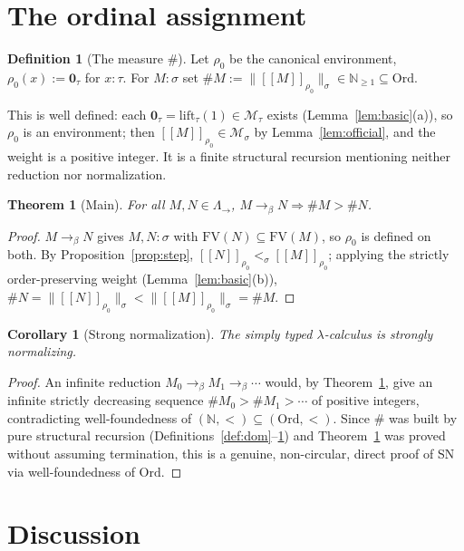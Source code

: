 \documentclass{amsart}
\newtheorem{theorem}{Theorem}
\newtheorem{corollary}{Corollary}
\theoremstyle{definition}
\newtheorem{definition}{Definition}
\newcommand{\Ord}{\mathrm{Ord}}
\newcommand{\interp}[1]{[\![#1]\!]}
\newcommand{\To}{\to_\beta}
\newcommand{\FV}{\mathrm{FV}}
\begin{document}
\section{The ordinal assignment}

\begin{definition}[The measure $\#$]\label{def:hash}
Let $\rho_0$ be the canonical environment, $\rho_0(x):=\mathbf 0_\tau$ for $x:\tau$. For
$M:\sigma$ set $\#M:=\|\interp{M}_{\rho_0}\|_\sigma\in\mathbb N_{\ge1}\subseteq\Ord$.
\end{definition}

This is well defined: each $\mathbf 0_\tau=\mathrm{lift}_\tau(1)\in\mathcal M_\tau$ exists
(Lemma~\ref{lem:basic}(a)), so $\rho_0$ is an environment; then
$\interp{M}_{\rho_0}\in\mathcal M_\sigma$ by Lemma~\ref{lem:official}, and the weight is a
positive integer. It is a finite structural recursion mentioning neither reduction nor
normalization.

\begin{theorem}[Main]\label{thm:main}
For all $M,N\in\Lambda_\to$, $M\To N\Rightarrow\#M>\#N$.
\end{theorem}

\begin{proof}
$M\To N$ gives $M,N:\sigma$ with $\FV(N)\subseteq\FV(M)$, so $\rho_0$ is defined on both.
By Proposition~\ref{prop:step}, $\interp{N}_{\rho_0}<_\sigma\interp{M}_{\rho_0}$; applying
the strictly order-preserving weight (Lemma~\ref{lem:basic}(b)),
$\#N=\|\interp{N}_{\rho_0}\|_\sigma<\|\interp{M}_{\rho_0}\|_\sigma=\#M$.
\end{proof}

\begin{corollary}[Strong normalization]\label{cor:SN}
The simply typed $\lambda$-calculus is strongly normalizing.
\end{corollary}

\begin{proof}
An infinite reduction $M_0\To M_1\To\cdots$ would, by Theorem~\ref{thm:main}, give an
infinite strictly decreasing sequence $\#M_0>\#M_1>\cdots$ of positive integers,
contradicting well-foundedness of $(\mathbb N,<)\subseteq(\Ord,<)$. Since $\#$ was built by
pure structural recursion (Definitions~\ref{def:dom}--\ref{def:hash}) and
Theorem~\ref{thm:main} was proved without assuming termination, this is a genuine,
non-circular, direct proof of SN via well-foundedness of $\Ord$.
\end{proof}

\section*{Discussion}
\end{document}
